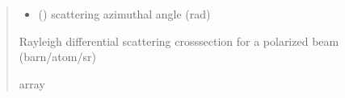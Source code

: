 \documentclass[letterpaper,10pt,english,openany,oneside]{sphinxmanual}
\begin{document}
\begin{fulllineitems}
\begin{quote}
\begin{description}
\begin{itemize}
\item {} 
\sphinxAtStartPar
{} () \textendash{} scattering azimuthal angle (rad)

\end{itemize}

\sphinxAtStartPar
Rayleigh differential scattering cross\sphinxhyphen{}section for a polarized beam
(barn/atom/sr)

\sphinxAtStartPar
array

\end{description}\end{quote}

\end{fulllineitems}


\begin{DUlineblock}{0em}
\item[] 
\end{DUlineblock}
\end{document}
